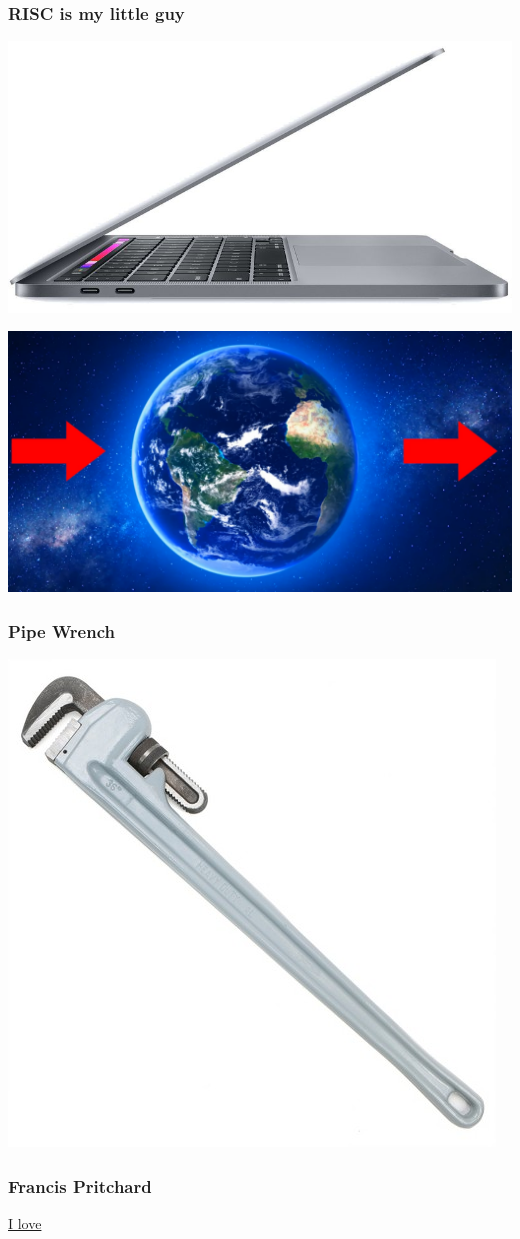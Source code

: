 \documentclass{beamer}
\begin{document}
\begin{frame}
	\frametitle{RISC is my little guy}
	\includegraphics[scale=0.3]{mbp.jpg}
\end{frame}

\begin{frame}
	\includegraphics[scale=0.25]{entropy.png}
\end{frame}

\begin{frame}
	\frametitle{Pipe Wrench}
	\includegraphics[scale=0.6]{pipe wrench.jpeg}
\end{frame}

\begin{frame}
	\frametitle{Francis Pritchard}
	\href{https://youtu.be/OQN1Im6bhPE?si=3LOMABaGI8UrKAqY&t=391}{I love}
\end{frame}
\end{document}
